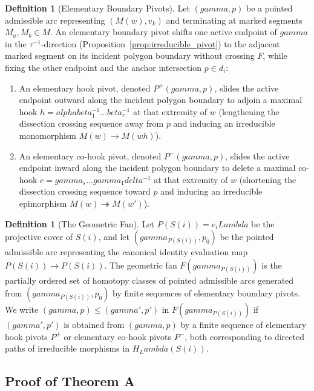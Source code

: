 \documentclass[11pt,a4paper,reqno]{amsart}
\def\mathcal#1{#1}%
\def\forb{F}%
\def\hookrightarrow{\to}%
\def\gamma{gamma}%
\def\alpha{alpha}%
\def\beta{beta}%
\def\delta{delta}%
\def\Lambda{Lambda}%
\def\emph#1{#1}%
\theoremstyle{definition}
\newtheorem{definition}[theorem]{Definition}
\theoremstyle{remark}
\newcommand{\forb}{\mathfrak{F}}
\begin{document}
\begin{definition}[Elementary Boundary Pivots]
\label{def:elementary_pivots}
Let $(\gamma, p)$ be a pointed admissible arc representing $(M(w), v_k)$ and terminating at marked segments $M_a, M_b \in \mathcal{M}$. An elementary boundary pivot shifts one active endpoint of $\gamma$ in the $\tau^{-1}$-direction (Proposition~\ref{prop:irreducible_pivot}) to the adjacent marked segment on its incident polygon boundary without crossing $\forb$, while fixing the other endpoint and the anchor intersection $p \in d_i$:
\begin{enumerate}
    \item An \emph{elementary hook pivot}, denoted $P^+(\gamma, p)$, slides the active endpoint outward along the incident polygon boundary to adjoin a maximal hook $h = \alpha\beta_1^{-1}\dots\beta_r^{-1}$ at that extremity of $w$ (lengthening the dissection crossing sequence away from $p$ and inducing an irreducible monomorphism $M(w) \hookrightarrow M(wh)$).
    \item An \emph{elementary co-hook pivot}, denoted $P^-(\gamma, p)$, slides the active endpoint inward along the incident polygon boundary to delete a maximal co-hook $c = \gamma_s\dots\gamma_1\delta^{-1}$ at that extremity of $w$ (shortening the dissection crossing sequence toward $p$ and inducing an irreducible epimorphism $M(w) \twoheadrightarrow M(w')$).
\end{enumerate}
\end{definition}

\begin{definition}[The Geometric Fan]
\label{def:geometric_fan}
Let $P(S(i)) = e_i\Lambda$ be the projective cover of $S(i)$, and let $(\gamma_{P(S(i))}, p_0)$ be the pointed admissible arc representing the canonical identity evaluation map $P(S(i)) \to P(S(i))$. The \emph{geometric fan} $\mathcal{F}(\gamma_{P(S(i))})$ is the partially ordered set of homotopy classes of pointed admissible arcs generated from $(\gamma_{P(S(i))}, p_0)$ by finite sequences of elementary boundary pivots. We write $(\gamma, p) \le (\gamma', p')$ in $\mathcal{F}(\gamma_{P(S(i))})$ if $(\gamma', p')$ is obtained from $(\gamma, p)$ by a finite sequence of elementary hook pivots $P^+$ or elementary co-hook pivots $P^-$, both corresponding to directed paths of irreducible morphisms in $H_\Lambda(S(i))$.
\end{definition}

\subsection{Proof of Theorem A}
\label{subsec:proof_thm_A}
\end{document}
